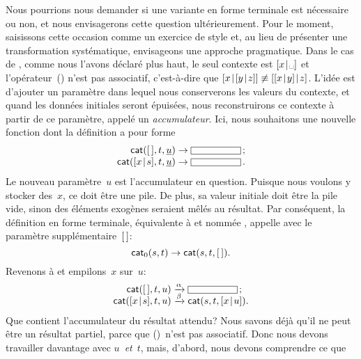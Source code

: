 Nous pourrions nous demander si une variante en forme terminale est
nécessaire ou non, et nous envisagerons cette question
ultérieurement. Pour le moment, saisissons cette occasion comme un
exercice de style et, au lieu de présenter une transformation
systématique, envisageons une approche pragmatique. Dans le cas de
, comme nous l'avons déclaré plus haut, le seul contexte
est \(\cons{x}{\text{\textvisiblespace}}\) et
l'opérateur~(\erlcode{|}) n'est pas associatif, c'est-à-dire que
\(\cons{x}{\cons{y}{z}} \not\equiv \cons{\cons{x}{y}}{z}\). L'idée est
d'ajouter un paramètre dans lequel nous conserverons les valeurs du
contexte, et quand les données initiales seront épuisées, nous
reconstruirons ce contexte à partir de ce paramètre, appelé un
\emph{accumulateur}. Ici, nous souhaitons une nouvelle fonction
 dont la définition a pour forme
\begin{equation*}
\begin{array}{r@{\;}c@{\;}l}
\fun{cat}(\el,t,\underline{u}) & \rightarrow & \fbcode{CCCCCCC}\,;\\
\fun{cat}(\cons{x}{s},t,\underline{u}) & \rightarrow & \fbcode{CCCCCCC}\,.
\end{array}
\end{equation*}
Le nouveau paramètre~\(u\) est l'accumulateur en question. Puisque
nous voulons y stocker des~\(x\), ce doit être une pile. De plus, sa
valeur initiale doit être la pile vide, sinon des éléments exogènes
seraient mêlés au résultat. Par conséquent, la définition en forme
terminale, équivalente à  et nommée ,
appelle  avec le paramètre supplémentaire~\([\,]\):
\begin{equation*}
\textsf{cat\(_0\)}(s,t) \rightarrow \textsf{cat}(s,t,[\,]).
\end{equation*}
Revenons à  et empilons~\(x\) sur~\(u\):
\begin{equation*}
\begin{array}{r@{\;}c@{\;}l}
\fun{cat}(\el,t,u) & \smashedrightarrow{\alpha} & \fbcode{CCCCCCC}\,;\\
\fun{cat}(\cons{x}{s},t,u) & \smashedrightarrow{\beta} &
  \fun{cat}(s,t,\cons{x}{u}).
\end{array}
\end{equation*}
Que contient l'accumulateur du résultat attendu? Nous savons déjà
qu'il ne peut être un résultat partiel, parce que (\erlcode{|})~n'est
pas associatif. Donc nous devons travailler davantage avec
\(u\)~\emph{et}~\(t\), mais, d'abord, nous devons comprendre ce que
